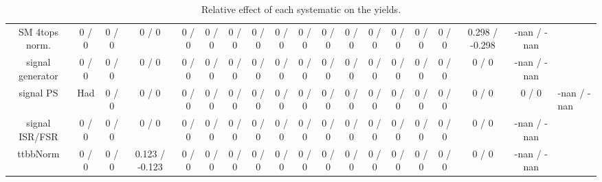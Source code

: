 \documentclass[10pt]{article}
\begin{document}
\begin{table}[htbp]
\begin{center}
\begin{tabular}{|c|c|c|c|c|c|c|c|c|c|c|c|c|c|c|c|c|c|}
  SM 4tops norm. & 0 / 0 & 0 / 0 & 0 / 0 & 0 / 0 & 0 / 0 & 0 / 0 & 0 / 0 & 0 / 0 & 0 / 0 & 0 / 0 & 0 / 0 & 0 / 0 & 0 / 0 & 0 / 0 & 0 / 0 & 0.298 / -0.298 & -nan / -nan \\ 
  signal generator & 0 / 0 & 0 / 0 & 0 / 0 & 0 / 0 & 0 / 0 & 0 / 0 & 0 / 0 & 0 / 0 & 0 / 0 & 0 / 0 & 0 / 0 & 0 / 0 & 0 / 0 & 0 / 0 & 0 / 0 & 0 / 0 & -nan / -nan \\ 
  signal PS & Had & 0 / 0 & 0 / 0 & 0 / 0 & 0 / 0 & 0 / 0 & 0 / 0 & 0 / 0 & 0 / 0 & 0 / 0 & 0 / 0 & 0 / 0 & 0 / 0 & 0 / 0 & 0 / 0 & 0 / 0 & 0 / 0 & -nan / -nan \\ 
  signal ISR/FSR & 0 / 0 & 0 / 0 & 0 / 0 & 0 / 0 & 0 / 0 & 0 / 0 & 0 / 0 & 0 / 0 & 0 / 0 & 0 / 0 & 0 / 0 & 0 / 0 & 0 / 0 & 0 / 0 & 0 / 0 & 0 / 0 & -nan / -nan \\ 
 ttbbNorm & 0 / 0 & 0 / 0 & 0.123 / -0.123 & 0 / 0 & 0 / 0 & 0 / 0 & 0 / 0 & 0 / 0 & 0 / 0 & 0 / 0 & 0 / 0 & 0 / 0 & 0 / 0 & 0 / 0 & 0 / 0 & 0 / 0 & -nan / -nan \\ 
\hline 
\end{tabular} 
\caption{Relative effect of each systematic on the yields.} 
\end{center} 
\end{table} 
\end{document}
